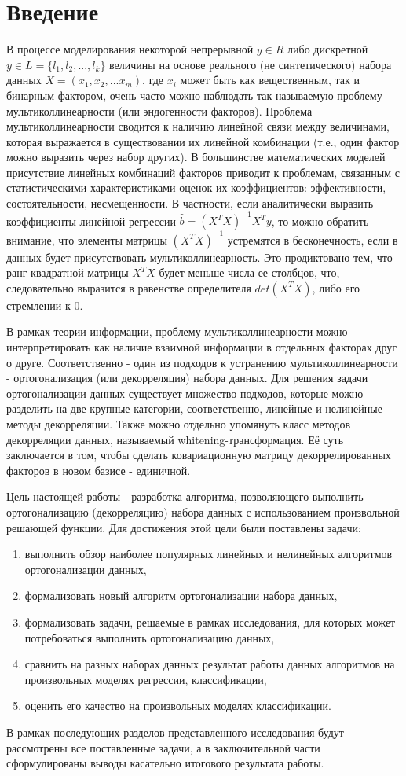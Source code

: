 \documentclass[runningheads]{llncs}
\begin{document}
\section{Введение}
В процессе моделирования некоторой непрерывной $y \in R$ либо дискретной $y \in L = \{l_1, l_2, ..., l_k\}$ величины на основе реального (не синтетического) набора данных $X = (x_1, x_2, ... x_m)$, где $x_i$ может быть как вещественным, так и бинарным фактором, очень часто можно наблюдать так называемую проблему мультиколлинеарности (или эндогенности факторов). Проблема мультиколлинеарности сводится к наличию линейной связи между величинами, которая выражается в существовании их линейной комбинации (т.е., один фактор можно выразить через набор других). В большинстве математических моделей присутствие линейных комбинаций факторов приводит к проблемам, связанным с статистическими характеристиками оценок их коэффициентов: эффективности, состоятельности, несмещенности. В частности, если аналитически выразить коэффициенты линейной регрессии $\hat{b} = (X^TX)^{-1}X^Ty$, то можно обратить внимание, что элементы матрицы $(X^TX)^{-1}$ устремятся в бесконечность, если в данных будет присутствовать мультиколлинеарность. Это продиктовано тем, что ранг квадратной матрицы $X^TX$ будет меньше числа ее столбцов, что, следовательно выразится в равенстве определителя $det(X^TX)$, либо его стремлении к $0$.
\par
В рамках теории информации, проблему мультиколлинеарности можно интерпретировать как наличие взаимной информации в отдельных факторах друг о друге. Соответственно - один из подходов к устранению мультиколлинеарности - ортогонализация (или декорреляция) набора данных. Для решения задачи ортогонализации данных существует множество подходов, которые можно разделить на две крупные категории,
соответственно, линейные и нелинейные методы декорреляции. Также можно отдельно упомянуть класс методов декорреляции данных, называемый whitening-трансформация. Её суть заключается в том, чтобы сделать ковариационную матрицу декоррелированных факторов в новом базисе - единичной. \par
Цель настоящей работы - разработка алгоритма, позволяющего выполнить ортогонализацию (декорреляцию) набора данных с использованием произвольной решающей функции. Для достижения этой цели были поставлены задачи:
\begin{enumerate}
  \item выполнить обзор наиболее популярных линейных и нелинейных алгоритмов ортогонализации данных,
  \item формализовать новый алгоритм ортогонализации набора данных,
  \item формализовать задачи, решаемые в рамках исследования, для которых может потребоваться выполнить ортогонализацию данных,
  \item сравнить на разных наборах данных результат работы данных алгоритмов на произвольных моделях регрессии, классификации,
  \item оценить его качество на произвольных моделях классификации.
\end{enumerate}
В рамках последующих разделов представленного исследования будут рассмотрены все поставленные задачи, а в заключительной части сформулированы выводы касательно итогового результата работы.
\end{document}
